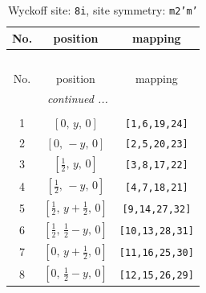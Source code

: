 \documentclass[fleqn,8pt]{jsarticle}
\begin{document}
\renewcommand{\arraystretch}{1.2}
\begin{longtable}{ccc}
\caption{Wyckoff site: {\tt 8i}, site symmetry: {\tt m2'm'}}
 \\
 \hline \hline
No. & position & mapping \\ \hline \endfirsthead

\multicolumn{2}{l}{\tablename\ \thetable{}} \\
 \hline \hline
No. & position & mapping \\ \hline \endhead

 \hline \hline
\multicolumn{2}{r}{\footnotesize\it continued ...} \\ \endfoot

 \hline \hline
\multicolumn{2}{r}{} \\ \endlastfoot

1 & $\left[ 0,\, y,\, 0 \right]$ & {\tt [1,6,19,24]} \\ \hline
2 & $\left[ 0,\, - y,\, 0 \right]$ & {\tt [2,5,20,23]} \\ \hline
3 & $\left[ \frac{1}{2},\, y,\, 0 \right]$ & {\tt [3,8,17,22]} \\ \hline
4 & $\left[ \frac{1}{2},\, - y,\, 0 \right]$ & {\tt [4,7,18,21]} \\ \hline
5 & $\left[ \frac{1}{2},\, y + \frac{1}{2},\, 0 \right]$ & {\tt [9,14,27,32]} \\ \hline
6 & $\left[ \frac{1}{2},\, \frac{1}{2} - y,\, 0 \right]$ & {\tt [10,13,28,31]} \\ \hline
7 & $\left[ 0,\, y + \frac{1}{2},\, 0 \right]$ & {\tt [11,16,25,30]} \\ \hline
8 & $\left[ 0,\, \frac{1}{2} - y,\, 0 \right]$ & {\tt [12,15,26,29]} \\
\end{longtable}
\renewcommand{\arraystretch}{1.2}
\end{document}
